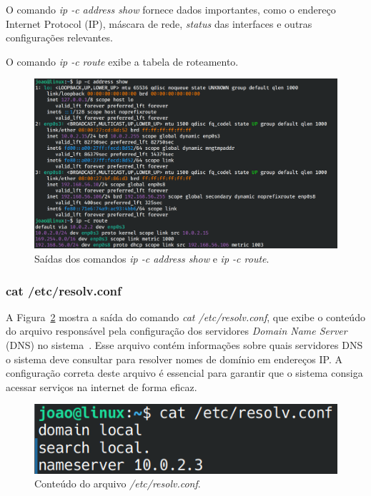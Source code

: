 \documentclass[
	12pt,				%
	oneside,   	        %
	a4paper,			%
	english,			%
	french,				%
	spanish,			%
	brazil,				%
	]{pacotes/abntex2}
\begin{document}
O comando \textit{ip -c address show} fornece dados importantes, como o endereço Internet Protocol (IP), máscara de rede, \textit{status} das interfaces e outras configurações relevantes.

O comando \textit{ip -c route} exibe a tabela de roteamento.

\begin{figure}[H]
  \centering
  \includegraphics[scale=0.5]{figuras/ip.png}
  \caption{Saídas dos comandos \textit{ip -c address show} e \textit{ip -c route}.}
  \label{fig:ip}
\end{figure}

\subsubsection{cat /etc/resolv.conf}
A Figura~\ref{fig:resolv} mostra a saída do comando \textit{cat /etc/resolv.conf}, que exibe o conteúdo do arquivo responsável pela configuração dos servidores \textit{Domain Name Server} (DNS) no sistema~\cite{manCat}. Esse arquivo contém informações sobre quais servidores DNS o sistema deve consultar para resolver nomes de domínio em endereços IP. A configuração correta deste arquivo é essencial para garantir que o sistema consiga acessar serviços na internet de forma eficaz. 

\begin{figure}[H]
  \centering
  \includegraphics[scale=0.37]{figuras/resolv.png}
  \caption{Conteúdo do arquivo \textit{/etc/resolv.conf}.}
  \label{fig:resolv}
\end{figure}
\end{document}
